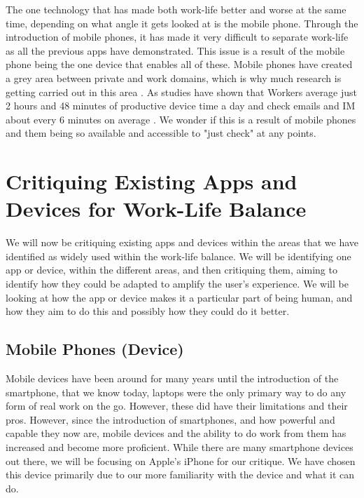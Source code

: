 \documentclass{sigchi}
\begin{document}
	The one technology that has made both work-life better and worse at the same time, depending on what angle it gets looked at is the mobile phone. Through the introduction of mobile phones, it has made it very difficult to separate work-life \cite{gronvall2016hci, sadler2006balancing} as all the previous apps have demonstrated. This issue is a result of the mobile phone being the one device that enables all of these. Mobile phones have created a grey area between private and work domains, which is why much research is getting carried out in this area \cite{fleck2015balancing}. As studies have shown that Workers average just 2 hours and 48 minutes of productive device time a day and check emails and IM about every 6 minutes on average \cite{rescuetime_study}. We wonder if this is a result of mobile phones and them being so available and accessible to "just check" at any points.
	
	\section{Critiquing Existing Apps and Devices for Work-Life Balance}
	
	We will now be critiquing existing apps and devices within the areas that we have identified as widely used within the work-life balance. We will be identifying one app or device, within the different areas, and then critiquing them, aiming to identify how they could be adapted to amplify the user's experience. We will be looking at how the app or device makes it a particular part of being human, and how they aim to do this and possibly how they could do it better.
	
		\subsection{Mobile Phones (Device)}
		Mobile devices have been around for many years until the introduction of the smartphone, that we know today, laptops were the only primary way to do any form of real work on the go. However, these did have their limitations and their pros. However, since the introduction of smartphones, and how powerful and capable they now are, mobile devices and the ability to do work from them has increased and become more proficient. While there are many smartphone devices out there, we will be focusing on Apple's iPhone for our critique. We have chosen this device primarily due to our more familiarity with the device and what it can do. 
		
\end{document}
